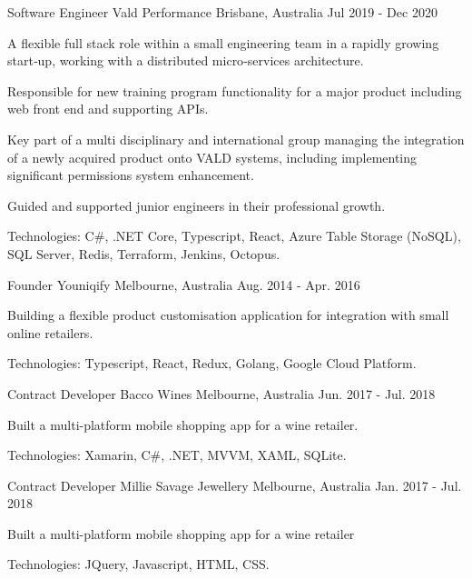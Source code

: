 \begin{cventries}
\cventry
{Software Engineer} %
{Vald Performance} %
{Brisbane, Australia} %
{Jul 2019 - Dec 2020} %
{
  \begin{cvitems} %
    \item {A flexible full stack role within a small engineering team in a rapidly growing start‑up, working with a distributed micro‑services architecture.}
    \item {Responsible for new training program functionality for a major product including web front end and supporting APIs.}
    \item {Key part of a multi disciplinary and international group managing the integration of a newly acquired product onto VALD systems, including implementing significant permissions system enhancement.}
    \item {Guided and supported junior engineers in their professional growth.}
    \item {Technologies: C\#, .NET Core, Typescript, React, Azure Table Storage (NoSQL), SQL Server, Redis, Terraform, Jenkins, Octopus.}
  \end{cvitems}
}

\cventry
{Founder} %
{Youniqify} %
{Melbourne, Australia} %
{Aug. 2014 - Apr. 2016} %
{
  \begin{cvitems} %
    \item {Building a flexible product customisation application for integration with small online retailers.}
    \item {Technologies: Typescript, React, Redux, Golang, Google Cloud Platform.} 
  \end{cvitems}
}

\cventry
{Contract Developer} %
{Bacco Wines} %
{Melbourne, Australia} %
{Jun. 2017 - Jul. 2018} %
{
  \begin{cvitems} %
    \item {Built a multi-platform mobile shopping app for a wine retailer.}
    \item {Technologies: Xamarin, C\#, .NET, MVVM, XAML, SQLite.}
  \end{cvitems}
}

\cventry
{Contract Developer} %
{Millie Savage Jewellery} %
{Melbourne, Australia} %
{Jan. 2017 - Jul. 2018} %
{
  \begin{cvitems} %
    \item {Built a multi-platform mobile shopping app for a wine retailer}
    \item {Technologies: JQuery, Javascript, HTML, CSS.}
  \end{cvitems}
}


\end{cventries}
